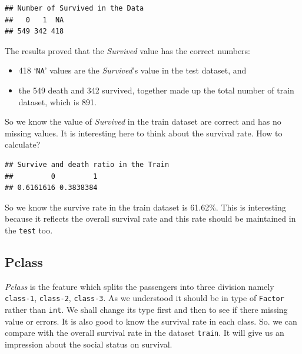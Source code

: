 \documentclass[
]{book}
\newenvironment{Shaded}{\begin{snugshade}}{\end{snugshade}}
\newcommand{\CommentTok}[1]{\textcolor[rgb]{0.56,0.35,0.01}{\textit{#1}}}
\newcommand{\DataTypeTok}[1]{\textcolor[rgb]{0.13,0.29,0.53}{#1}}
\newcommand{\KeywordTok}[1]{\textcolor[rgb]{0.13,0.29,0.53}{\textbf{#1}}}
\newcommand{\NormalTok}[1]{#1}
\newcommand{\OperatorTok}[1]{\textcolor[rgb]{0.81,0.36,0.00}{\textbf{#1}}}
\newcommand{\StringTok}[1]{\textcolor[rgb]{0.31,0.60,0.02}{#1}}
\providecommand{\tightlist}{%
  \setlength{\itemsep}{0pt}\setlength{\parskip}{0pt}}
\begin{document}
\begin{verbatim}
## Number of Survived in the Data
##   0   1  NA 
## 549 342 418
\end{verbatim}

The results proved that the \emph{Survived} value has the correct numbers:

\begin{itemize}
\tightlist
\item
  418 `\texttt{NA}' values are the \emph{Survived}'s value in the test dataset, and
\item
  the 549 death and 342 survived, together made up the total number of train dataset, which is 891.
\end{itemize}

So we know the value of \emph{Survived} in the train dataset are correct and has no missing values. It is interesting here to think about the survival rate. How to calculate?

\begin{Shaded}
\end{Shaded}

\begin{verbatim}
## Survive and death ratio in the Train
##         0         1 
## 0.6161616 0.3838384
\end{verbatim}

So we know the survive rate in the train dataset is 61.62\%. This is interesting because it reflects the overall survival rate and this rate should be maintained in the \texttt{test} too.

\hypertarget{pclass}{%
\subsection*{Pclass}\label{pclass}}


\emph{Pclass} is the feature which splits the passengers into three division namely \texttt{class-1}, \texttt{class-2}, \texttt{class-3}. As we understood it should be in type of \texttt{Factor} rather than \texttt{int}. We shall change its type first and then to see if there missing value or errors. It is also good to know the survival rate in each class. So. we can compare with the overall survival rate in the dataset \texttt{train}. It will give us an impression about the social status on survival.
\end{document}

